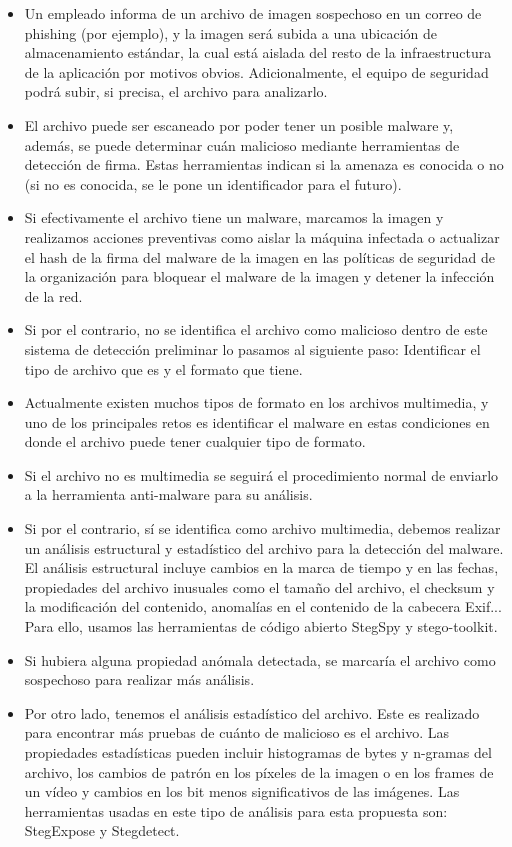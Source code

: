 \begin{itemize}
\item Un empleado informa de un archivo de imagen sospechoso en un correo de phishing (por ejemplo), y la imagen será subida a una ubicación de almacenamiento estándar, la cual está aislada del resto de la infraestructura de la aplicación por motivos obvios. Adicionalmente, el equipo de seguridad podrá subir, si precisa, el archivo para analizarlo.
\item El archivo puede ser escaneado por poder tener un posible malware y, además, se puede determinar cuán malicioso mediante herramientas de detección de firma. Estas herramientas indican si la amenaza es conocida o no (si no es conocida, se le pone un identificador para el futuro). %
\item Si efectivamente el archivo tiene un malware, marcamos la imagen y realizamos acciones preventivas como aislar la máquina infectada o actualizar el hash de la firma del malware de la imagen en las políticas de seguridad de la organización para bloquear el malware de la imagen y detener la infección de la red.
\item Si por el contrario, no se identifica el archivo como malicioso dentro de este sistema de detección preliminar lo pasamos al siguiente paso: Identificar el tipo de archivo que es y el formato que tiene.
\item Actualmente existen muchos tipos de formato en los archivos multimedia, y uno de los principales retos es identificar el malware en estas condiciones en donde el archivo puede tener cualquier tipo de formato.
\item Si el archivo no es multimedia se seguirá el procedimiento normal de enviarlo a la herramienta anti-malware para su análisis.
\item Si por el contrario, sí se identifica como archivo multimedia, debemos realizar un análisis estructural y estadístico del archivo para la detección del malware. El análisis estructural incluye cambios en la marca de tiempo y en las fechas, propiedades del archivo inusuales como el tamaño del archivo, el checksum y la modificación del contenido, anomalías en el contenido de la cabecera Exif... Para ello, usamos las herramientas de código abierto StegSpy y stego-toolkit. %
\item Si hubiera alguna propiedad anómala detectada, se marcaría el archivo como sospechoso para realizar más análisis.
\item Por otro lado, tenemos el análisis estadístico del archivo. Este es realizado para encontrar más pruebas de cuánto de malicioso es el archivo. Las propiedades estadísticas pueden incluir histogramas de bytes y n-gramas del archivo, los cambios de patrón en los píxeles de la imagen o en los frames de un vídeo y cambios en los bit menos significativos de las imágenes. Las herramientas usadas en este tipo de análisis para esta propuesta son: StegExpose y Stegdetect. %

\end{itemize}
